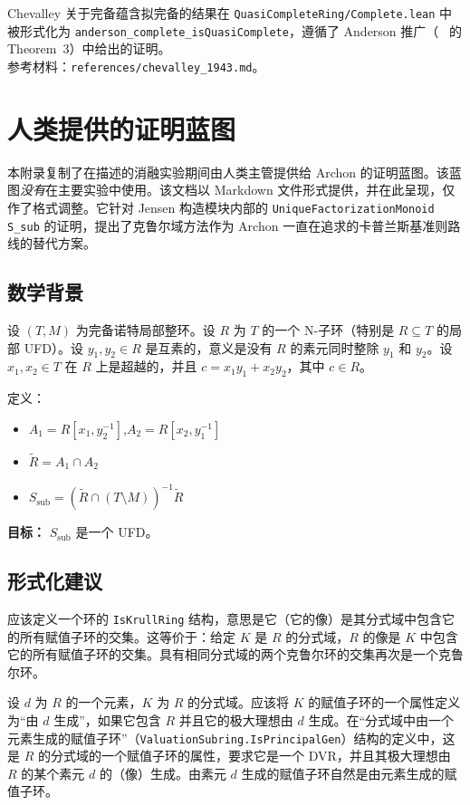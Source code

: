﻿\documentclass[]{pkuai4m}
\theoremstyle{plain}
\theoremstyle{definition}
\begin{document}
Chevalley 关于完备蕴含拟完备的结果在 \texttt{QuasiCompleteRing/Complete.lean} 中被形式化为 \texttt{anderson\_complete\_isQuasiComplete}，遵循了 Anderson 推广（~\cite{anderson2014quasi} 的 Theorem~3）中给出的证明。\\
参考材料：\texttt{references/chevalley\_1943.md}。

\section{人类提供的证明蓝图}\label{appendix:human-blueprint}

本附录复制了在描述的消融实验期间由人类主管提供给 Archon 的证明蓝图。该蓝图\emph{没有}在主要实验中使用。该文档以 Markdown 文件形式提供，并在此呈现，仅作了格式调整。它针对 Jensen 构造模块内部的 \texttt{UniqueFactorizationMonoid S\_sub} 的证明，提出了克鲁尔域方法作为 Archon 一直在追求的卡普兰斯基准则路线的替代方案。

\subsection*{数学背景}

设 $(T, M)$ 为完备诺特局部整环。设 $R$ 为 $T$ 的一个 N-子环（特别是 $R \subseteq T$ 的局部 UFD）。设 $y_1, y_2 \in R$ 是互素的，意义是没有 $R$ 的素元同时整除 $y_1$ 和 $y_2$。设 $x_1, x_2 \in T$ 在 $R$ 上是超越的，并且 $c = x_1 y_1 + x_2 y_2$，其中 $c \in R$。

定义：
\begin{itemize}
    \item $A_1 = R[x_1, y_2^{-1}]$,\quad $A_2 = R[x_2, y_1^{-1}]$
    \item $\tilde{R} = A_1 \cap A_2$
    \item $S_{\mathrm{sub}} = (\tilde{R} \cap (T \setminus M))^{-1}\tilde{R}$
\end{itemize}

\noindent\textbf{目标：} $S_{\mathrm{sub}}$ 是一个 UFD。

\subsection*{形式化建议}

应该定义一个环的 \texttt{IsKrullRing} 结构，意思是它（它的像）是其分式域中包含它的所有赋值子环的交集。这等价于：给定 $K$ 是 $R$ 的分式域，$R$ 的像是 $K$ 中包含它的所有赋值子环的交集。具有相同分式域的两个克鲁尔环的交集再次是一个克鲁尔环。

设 $d$ 为 $R$ 的一个元素，$K$ 为 $R$ 的分式域。应该将 $K$ 的赋值子环的一个属性定义为“由 $d$ 生成”，如果它包含 $R$ 并且它的极大理想由 $d$ 生成。在“分式域中由一个元素生成的赋值子环”（\texttt{ValuationSubring.IsPrincipalGen}）结构的定义中，这是 $R$ 的分式域的一个赋值子环的属性，要求它是一个 DVR，并且其极大理想由 $R$ 的某个素元 $d$ 的（像）生成。由素元 $d$ 生成的赋值子环自然是由元素生成的赋值子环。
\end{document}
